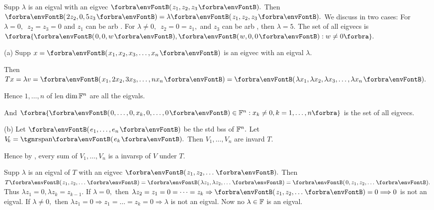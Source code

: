 Supp $\lambda$ is an eigval with an eigvec $\Par{z_1,z_2,z_3}.$\parSol{}
Then $\Par{2z_2, 0,5z_3}=\lambda\Par{z_1,z_2,z_3}.$ We discuss in two cases:\parSol{}
For $\lambda=0,$\, $z_2=z_3=0$ and $z_1$ can be arb .\parSol{}
For $\lambda\neq 0,$\, $z_2=0=z_1,$ and $z_3$ can be arb , then $\lambda=5$.\parSol{}
The set of all eigvecs is $\Bra{\Par{0,0,w},\Par{w,0,0}:w\neq 0}.$\PfEnd
\SepLine

\par\quad
(a) Supp $x=\Par{x_1,x_2,x_3,\dots,x_n}$ is an eigvec with an eigval $\lambda.$\par\quad\Ha
Then $Tx=\lambda v=\Par{x_1,2 x_2,3 x_3,\dots,n x_n}=\Par{\lambda x_1,\lambda x_2,\lambda x_3,\dots,\lambda x_n}.$\par\quad\Ha
Hence $1,\dots,n$ of len $\dim{\mathbb{F}}^n$ are all the eigvals.\par\quad\Ha
And $\Bra{\Par{0,\dots,0,x_k,0,\dots,0}\in\Fbb^n:x_k\neq 0,k=1,\dots,n}$ is the set of all eigvecs.\par\quad
(b) Let $\Par{e_1,\dots,e_n}$ be the std bss of ${\mathbb{F}}^n.$ Let $V_{\!k}=\Span{e_k}.$ Then $V_{\!1},\dots,V_{\!n}$ are invard $T.$\par\quad\Hb
Hence by , every sum of $V_{\!1},\dots,V_{\!n}$ is a invarsp of $V$ under $T.$\PfEnd
\SepLine

Supp $\lambda$ is an eigval of $T$ with an eigvec $\Par{z_1,z_2,\dots}.$\parSol{}
Then $T\Par{z_1,z_2,\dots}=\Par{\lambda z_1,\lambda z_2,\dots}=\Par{0,z_1,z_2,\dots}.$ Thus $\lambda z_1=0,\lambda z_k=z_{k-1}.$\parSol{}
If $\lambda=0,$ then $\lambda z_2=z_1=0=\dots=z_k\Rightarrow\Par{z_1,z_2,\dots}=0\Longrightarrow0$ is not an eigval.\parSol{}
If $\lambda\neq 0,$ then $\lambda z_1=0\Rightarrow z_1=\dots=z_k=0\Longrightarrow\lambda$ is not an eigval. Now no $\lambda\in{\mathbb{F}}$ is an eigval.\PfEnd
\SepLine


